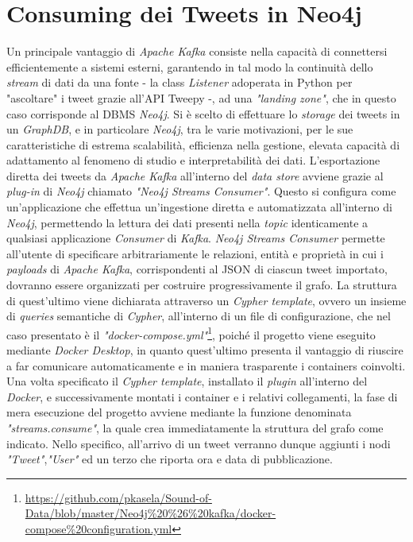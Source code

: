\documentclass[12pt, a4paper, twocolumn]{article} %
\begin{document}
\section{Consuming dei Tweets in Neo4j}
Un principale vantaggio di \textit{Apache Kafka} consiste nella capacità di connettersi efficientemente a sistemi esterni, garantendo in tal modo la continuità dello \textit{stream} di dati da una fonte - la class \textit{Listener} adoperata in Python per "ascoltare" i tweet grazie all'API Tweepy -, ad una \textit{"landing zone"}, che in questo caso corrisponde al DBMS \textit{Neo4j}. 
Si è scelto di effettuare lo \textit{storage} dei tweets in un \textit{GraphDB}, e in particolare \textit{Neo4j}, tra le varie motivazioni, per le sue caratteristiche di estrema scalabilità, efficienza nella gestione, elevata capacità di adattamento al fenomeno di studio e interpretabilità dei dati.
L'esportazione diretta dei tweets da \textit{Apache Kafka} all'interno del \textit{data store} avviene grazie al \textit{plug-in} di \textit{Neo4j} chiamato \textit{"Neo4j Streams Consumer"}. Questo si configura come un'applicazione che effettua un'ingestione diretta e automatizzata all'interno di \textit{Neo4j}, permettendo la lettura dei dati presenti nella \textit{topic} identicamente a qualsiasi applicazione \textit{Consumer} di \textit{Kafka}. 
\textit{Neo4j Streams Consumer} permette all'utente di specificare arbitrariamente le relazioni, entità e proprietà in cui i \textit{payloads} di \textit{Apache Kafka}, corrispondenti al JSON di ciascun tweet importato, dovranno essere organizzati per costruire progressivamente il grafo.
La struttura di quest'ultimo viene dichiarata attraverso un \textit{Cypher template}, ovvero un insieme di \textit{queries} semantiche di \textit{Cypher}, all'interno di un file di configurazione, che nel caso presentato è il \textit{"docker-compose.yml"}\footnote{\url{https://github.com/pkasela/Sound-of-Data/blob/master/Neo4j\%20\%26\%20kafka/docker-compose\%20configuration.yml}}, poiché il progetto viene eseguito mediante \textit{Docker Desktop}, in quanto quest'ultimo presenta il vantaggio di riuscire a far comunicare automaticamente e in maniera trasparente i containers coinvolti. 
Una volta specificato il \textit{Cypher template}, installato il \textit{plugin} all'interno del \textit{Docker}, e successivamente montati i container e i relativi collegamenti, la fase di mera esecuzione del progetto avviene mediante la funzione denominata \textit{"streams.consume"}, la quale crea immediatamente la struttura del grafo come indicato. 
Nello specifico, all'arrivo di un tweet verranno dunque aggiunti i nodi \textit{"Tweet"},\textit{"User"} ed un terzo che riporta ora e data di pubblicazione. 
\end{document}
